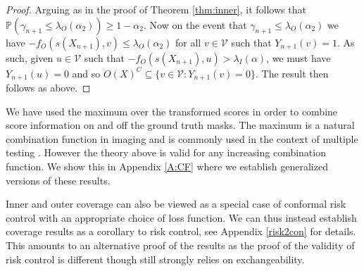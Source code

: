 \begin{proof}
	Arguing as in the proof of Theorem \ref{thm:inner}, it follows that $\mathbb{P}\left(\gamma_{n+1} \leq \lambda_O(\alpha_2) \right) \geq 1 - \alpha_2.$
	Now on the event that $\gamma_{n+1}\leq \lambda_O(\alpha_2)$ we have $ -f_O(s(X_{n+1}),v) \leq \lambda_O(\alpha_2) $ for all $v \in \mathcal{V}$ such that $Y_{n+1}(v) = 1$. As such, given $u \in \mathcal{V}$ such that $ -f_O(s(X_{n+1}),u) > \lambda_I(\alpha) $, we must have $Y_{n+1}(u) = 0$ and so $	O(X)^C  \subseteq \lbrace v\in \mathcal{V}: Y_{n+1}(v) = 0 \rbrace  $. The result then follows as above.
\end{proof}
\begin{remark}\label{rmk:max}
	We have used the maximum over the transformed scores in order to combine score information on and off the ground truth masks. The maximum is a natural combination function in imaging and is commonly used in the context of multiple testing \citep{Worsley1992}. However the theory above is valid for any increasing combination function. We show this in Appendix \ref{A:CF} where we establish generalized versions of these results.
\end{remark}
\begin{remark}
	Inner and outer coverage can also be viewed as a special case of conformal risk control with an appropriate choice of loss function. We can thus instead establish coverage results as a corollary to risk control, see Appendix \ref{risk2con} for details. This amounts to an alternative proof of the results as the proof of the validity of risk control is different though still strongly relies on exchangeability.
\end{remark}


